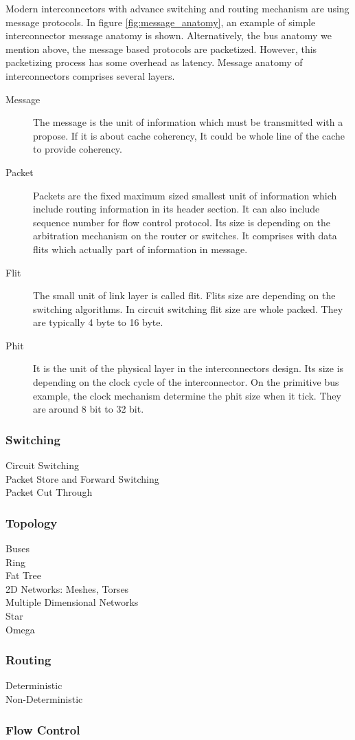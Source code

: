 Modern interconncetors with advance switching and routing mechanism are using message protocols.  In figure \ref{fig:message_anatomy}, an example of simple interconnector message anatomy is shown. Alternatively, the bus anatomy we mention above, the message based protocols are packetized. However, this packetizing process has some overhead as latency\cite{ComputerArchCoursera}. Message anatomy of interconnectors comprises several layers\cite{0122007514}.
\begin{description}
\item[Message]The message is the unit of information which must be transmitted with a propose. If it is about cache coherency, It could be whole line of the cache to provide coherency.
\item[Packet]Packets are the fixed maximum sized  smallest unit of information which include routing information in its header section. It can also include sequence number for flow control protocol. Its size is depending on the arbitration mechanism on the router or switches. It comprises with data flits which actually part of information in message.
\item[Flit]The small unit of link layer is called flit. Flits size are depending on the switching algorithms. In circuit switching flit size are whole packed. They are typically 4 byte to 16 byte.
\item[Phit]It is the unit of the physical layer in the interconnectors design. Its size is depending on the clock cycle of the interconnector. On the primitive bus example, the clock mechanism determine the phit size when it tick. They are around 8 bit to 32 bit.
\end{description}
 

\subsubsection{Switching}
\begin{description}
\item[Circuit Switching]
\item[Packet Store and Forward Switching]
\item[Packet Cut Through]
\end{description}
\subsubsection{Topology}
\begin{description}
\item[Buses]
\item[Ring]
\item[Fat Tree]
\item[2D Networks: Meshes, Torses]
\item[Multiple Dimensional Networks]
\item[Star]
\item[Omega]
\end{description}
\subsubsection{Routing}
\begin{description}
\item[Deterministic]
\item[Non-Deterministic]
\end{description}
\subsubsection{Flow Control}

